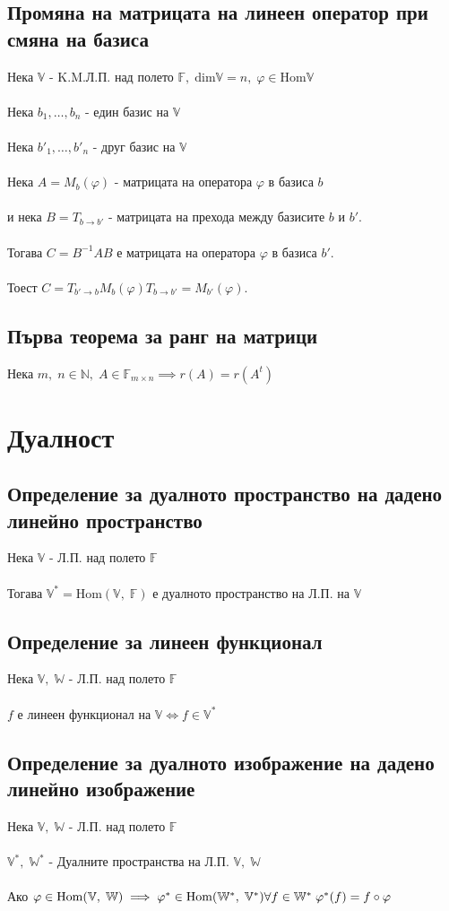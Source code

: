 \documentclass{article}
\newcommand{\V}{\mathbb{V}}
\newcommand{\N}{\mathbb{N}}
\newcommand{\F}{\mathbb{F}}
\newcommand{\W}{\mathbb{W}}
\newcommand{\n}[1]{#1_1, \dots, #1_n}
\begin{document}
    \subsection{Промяна на матрицата на линеен оператор при смяна на базиса}
    Нека \(\V\) - K.M.Л.П. над полето \(\F, \; \mathrm{dim}\V = n, \; \varphi \in \mathrm{Hom}\V\) \\\\
    Нека \(\n{b}\) - един базис на \(\V\) \\\\
    Нека \(\n{b'}\) - друг базис на \(\V\) \\\\
    Нека \(A = M_b(\varphi)\) - матрицата на оператора \(\varphi\) в базиса \(b\) \\\\
    и нека \(B = T_{b \to b'}\) - матрицата на прехода между базисите \(b\) и \(b'\). \\\\
    Тогава \(C = B^{-1}AB\) е матрицата на оператора \(\varphi\) в базиса \(b'\). \\\\
    Тоест \(C = T_{b' \to b}M_b(\varphi)T_{b \to b'} = M_{b'}(\varphi)\).
    \subsection{Първа теорема за ранг на матрици}
    Нека \(m, \; n \in \N, \; A \in \F_{m \times n} \implies r(A) = r(A^t)\)
    \section{Дуалност}
    \subsection{Определение за дуалното пространство на дадено линейно пространство}
    Нека \(\V\) - Л.П. над полето \(\F\) \\\\
    Тогава \(\V^* = \mathrm{Hom}(\V, \; \F)\) е дуалното пространство на Л.П. на \(\V\)
    \subsection{Определение за линеен функционал}
    Нека \(\V, \; \W\) - Л.П. над полето \(\F\) \\\\
    \(f\) е линеен функционал на \(\V \iff f \in \V^*\)
    \subsection{Определение за дуалното изображение на дадено линейно изображение}
    Нека \(\V, \; \W\) - Л.П. над полето \(\F\) \\\\
    \(\V^*, \; \W^*\) - Дуалните пространства на Л.П. \(\V, \; \W \) \\\\
    Ако \(\varphi \in \mathrm{Hom}(\V, \; \W) \implies \varphi^* \in \mathrm{Hom}(\W^*, \; \V^*) \\\\
    \forall f \in \W^* \; \varphi^*(f) = f \circ \varphi\)
\end{document}
